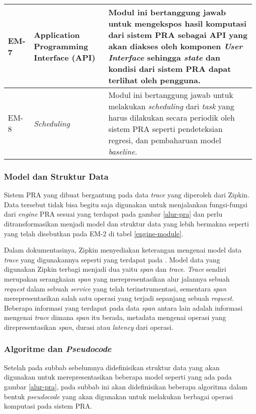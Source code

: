 \begin{small}
\begin{longtable}{ | p{1cm} | p{3cm} | p{10cm} | }
		EM-7 & Application Programming Interface (API) & Modul ini bertanggung jawab untuk mengekspos hasil komputasi dari sistem PRA sebagai API yang akan diakses oleh komponen \textit{User Interface} sehingga \textit{state} dan kondisi dari sistem PRA dapat terlihat oleh pengguna. \\ \hline
		EM-8 & \textit{Scheduling} & Modul ini bertanggung jawab untuk melakukan \textit{scheduling} dari \textit{task} yang harus dilakukan secara periodik oleh sistem PRA seperti pendeteksian regresi, dan pembaharuan model \textit{baseline}. \\ \hline
	\end{longtable}
\end{small}

\subsubsection{Model dan Struktur Data}
Sistem PRA yang dibuat bergantung pada data \textit{trace} yang diperoleh dari Zipkin. Data tersebut tidak bisa begitu saja digunakan untuk menjalankan fungsi-fungsi dari \textit{engine} PRA sesuai yang terdapat pada gambar \ref{alur-pra} dan perlu ditransformasikan menjadi model dan struktur data yang lebih bermakna seperti yang telah disebutkan pada EM-2 di tabel \ref{engine-module}.

Dalam dokumentasinya, Zipkin menyediakan keterangan mengenai model data \textit{trace} yang digunakannya seperti yang terdapat pada \citep{zipkin-data}. Model data yang digunakan Zipkin terbagi menjadi dua yaitu \textit{span} dan \textit{trace}. \textit{Trace} sendiri merupakan serangkaian \textit{span} yang merepresentasikan alur jalannya sebuah \textit{request} dalam sebuah \textit{service} yang telah terinstrumentasi, sementara \textit{span} merepresentasikan salah satu operasi yang terjadi sepanjang sebuah \textit{request}. Beberapa informasi yang terdapat pada data \textit{span} antara lain adalah informasi mengenai \textit{trace} dimana \textit{span} itu berada, metadata mengenai operasi yang direpresentasikan \textit{span}, durasi atau \textit{latency} dari operasi.







\subsubsection{Algoritme dan \textit{Pseudocode}}
Setelah pada subbab sebelumnya didefinisikan struktur data yang akan digunakan untuk merepresentasikan beberapa model seperti yang ada pada gambar \ref{alur-pra}, pada subbab ini akan didefinisikan beberapa algoritma dalam bentuk \textit{pseudocode} yang akan digunakan untuk melakukan berbagai operasi komputasi pada sistem PRA.

